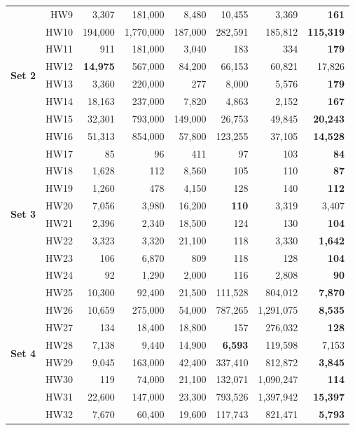 \documentclass[preprint,12pt]{elsarticle}
\begin{document}
\begin{table}[htp]
{\begin{tabular}{l|r|r|r|r|r|r|r}
\multirow{8}{*}{\textbf{Set 2}} 
& HW9  & 3,307 & 181,000 & 8,480 & 10,455 & 3,369 & \textbf{161} \\ 
& HW10 & 194,000 & 1,770,000 & 187,000 & 282,591 & 185,812 & \textbf{115,319} \\ 
& HW11 & 911 & 181,000 & 3,040 & {183} & 334 & \textbf{179} \\ 
& HW12 & \textbf{14,975} & 567,000 & 84,200 & 66,153 & 60,821 & {17,826} \\ 
& HW13 & 3,360 & 220,000 & 277 & 8,000 & 5,576 & \textbf{179} \\ 
& HW14 & 18,163 & 237,000 & 7,820 & 4,863 & 2,152 & \textbf{167} \\ 
& HW15 & 32,301 & 793,000 & 149,000 & 26,753 & 49,845 & \textbf{20,243} \\ 
& HW16 & 51,313 & 854,000 & 57,800 & 123,255 & 37,105 & \textbf{14,528} \\ \hline
\multirow{8}{*}{\textbf{Set 3}} 
& HW17 & 85 & 96 & 411 & 97 & 103 & \textbf{84} \\ 
& HW18 & 1,628 & 112 & 8,560 & 105 & 110 & \textbf{87} \\ 
& HW19 & 1,260 & 478 & 4,150 & 128 & 140 & \textbf{112} \\ 
& HW20 & 7,056 & 3,980 & 16,200 & \textbf{110} & 3,319 & 3,407 \\ 
& HW21 & 2,396 & 2,340 & 18,500 & 124 & 130 & \textbf{104} \\ 
& HW22 & 3,323 & {3,320} & 21,100 & 118 & 3,330 & \textbf{1,642} \\ 
& HW23 & 106 & 6,870 & 809 & 118 & 128 & \textbf{104} \\ 
& HW24& 92 & 1,290 & 2,000  & 116 & 2,808 & \textbf{90} \\ \hline
\multirow{8}{*}{\textbf{Set 4}} 
& HW25& 10,300& 92,400& 21,500 & 111,528& 804,012& \textbf{7,870}\\ 
& HW26& 10,659& 275,000& 54,000 & 787,265 & 1,291,075& \textbf{8,535}\\ 
& HW27& 134& 18,400 & 18,800& 157& 276,032& \textbf{128}\\ 
 & HW28  & 7,138& 9,440 & 14,900 & \textbf{6,593}& 119,598& 7,153  \\ 
& HW29 & 9,045 & 163,000 & 42,400& 337,410 & 812,872 & \textbf{3,845}\\ 
& HW30  & 119 & 74,000 & 21,100  & 132,071 & 1,090,247& \textbf{114} \\ 
& HW31& 22,600 & 147,000 & 23,300  & 793,526 & 1,397,942  & \textbf{15,397}  \\
& HW32& 7,670 & 60,400  & 19,600 & 117,743 & 821,471  & \textbf{5,793} \\ \hline
    \end{tabular}
    }
\end{table}
\end{document}
